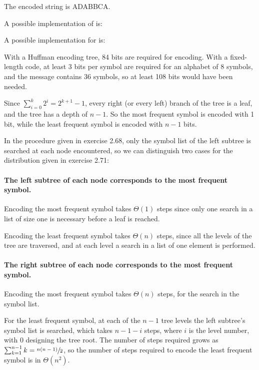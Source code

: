 \begin{exe}[2.67]
    The encoded string is ADABBCA.
\end{exe}

\begin{exe}[2.68]
    A possible implementation of  is:
\end{exe}

\begin{exe}[2.69]
    A possible implementation for  is:
\end{exe}

\begin{exe}[2.70]
    With a Huffman encoding tree, 84 bits are required for encoding.
    With a fixed-length code, at least 3 bits per symbol are required for an 
    alphabet of 8 symbols, and the message contains 36 symbols, so at least 108 
    bits would have been needed.
\end{exe}

\begin{exe}[2.71]
    Since $\sum_{i = 0}^{k} 2^i = 2^{k + 1} - 1$, every right (or every left) 
    branch of the tree is a leaf, and the tree has a depth of $n - 1$. So the 
    most frequent symbol is encoded with 1 bit, while the least frequent symbol 
    is encoded with $n - 1$ bits.
\end{exe}

\begin{exe}[2.72]
    In the  procedure given in exercise 2.68, only the 
    symbol list of the left subtree is searched at each node encountered, so we 
    can distinguish two cases for the distribution given in exercise 2.71:

    \paragraph*{The left subtree of each node corresponds to the most frequent 
    symbol.}
    Encoding the most frequent symbol takes $\Theta(1)$ steps since only 
    one search in a list of size one is necessary before a leaf is reached.

    Encoding the least frequent symbol takes $\Theta(n)$ steps, since 
    all the levels of the tree are traversed, and at each level a search in 
    a list of one element is performed.

    \paragraph*{The right subtree of each node corresponds to the most frequent 
    symbol.}
    Encoding the most frequent symbol takes $\Theta(n)$ steps, for the search in 
    the symbol list.

    For the least frequent symbol, at each of the $n - 1$ tree levels the left 
    subtree’s symbol list is searched, which takes $n - 1 - i$ steps, where $i$ 
    is the level number, with $0$ designing the tree root. The number of steps 
    required grows as $\sum_{k = 1}^{n - 1} k = \sfrac{n (n - 1)}{2}$, so the 
    number of steps required to encode the least frequent symbol is in 
    $\Theta(n^2)$.
\end{exe}

